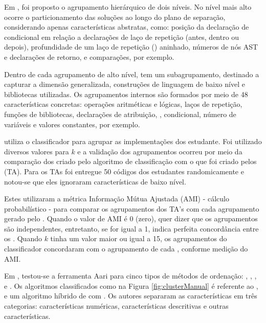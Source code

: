 	    
	    Em , foi proposto o agrupamento hierárquico de dois
	    níveis. No nível mais alto ocorre o particionamento das soluções ao longo do
	    plano de separação, considerando apenas características abstratas, como:
	    posição da declaração de condicional em relação a declarações de laço de
	    repetição (antes, dentro ou depois), profundidade de um laço de repetição
	    () aninhado, números de nós AST e declarações de retorno,
	     e comparações, por exemplo.
	    
	    Dentro de cada agrupamento de alto nível, tem um subagrupamento, destinado a
	    capturar a dimensão generalizada, construções de linguagem de baixo nível e
	    bibliotecas utilizadas. Os agrupamentos internos são formados por meio de 48
	    características concretas: operações aritméticas e lógicas, laços de repetição,
	    funções de bibliotecas, declarações de atribuição, , condicional,
	    número de variáveis e valores constantes, por exemplo.
	    
	     utiliza o classificador  para agrupar
	    as implementações dos estudante. Foi utilizado diversos valores para $k$
	    e a validação dos agrupamentos ocorreu por meio da comparação dos 
	    criado pelo algoritmo de classificação com o que foi criado pelos
	     (TA). Para os TAs foi entregue 50 códigos
	    dos estudantes randomicamente e notou-se que eles ignoraram características
	    de baixo nível.
	    
	    Estes utilizaram a métrica Informação Mútua Ajustada (AMI) - cálculo
	    probabilístico - para comparar os agrupamentos dos TA's com cada agrupamento
	    gerado pelo . Quando o valor de AMI é 0 (zero), quer dizer
	    que os agrupamentos são independentes, entretanto, se for igual a 1, indica
	    perfeita concordância entre os . Quando $k$ tinha um
	    valor maior ou igual a 15, os agrupamentos do classificador concordaram com
	    o agrupamento de cada , conforme medição do AMI.
	    
	    Em , testou-se a ferramenta Aari para cinco tipos
	    de métodos de ordenação: , ,
	    ,  e . Os
	    algoritmos classificados como  na Figura \ref{fig:clusterManual}
	    é referente ao ,  e um algoritmo híbrido de
	     com . Os autores separaram as
	    características em três categorias: características numéricas, características
	    descritivas e outras características.
	    
